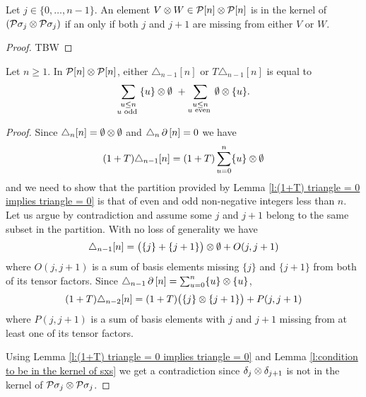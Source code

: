 
\begin{lemma} \label{l:condition to be in the kernel of sxs}
	Let $j \in \{0, \dots, n-1\}$.
	An element $V \otimes W \in \mathcal{P}[n] \otimes \mathcal{P}[n]$ is in the kernel of $(\mathcal{P} \sigma_j \otimes \mathcal{P} \sigma_j)$ if an only if both $j$ and $j+1$ are missing from either $V$ or $W$.
\end{lemma}

\begin{proof}
	TBW
\end{proof}

\begin{lemma}
	Let $n \geq 1$.
	In $\mathcal{P}[n] \otimes \mathcal{P}[n]$, either $\triangle_{n-1} [n]$ or $T \triangle_{n-1} [n]$ is equal to
	\[
	\sum_{\substack{u \leq n \\ u \text{ odd }}} \{u\} \otimes \emptyset \ +
	\sum_{\substack{u \leq n \\ u \text{ even }}} \emptyset \otimes \{u\}.
	\]
\end{lemma}

\begin{proof}
	Since $\triangle_{n} [n] = \emptyset \otimes \emptyset$ and $\triangle_{n} \operatorname{\partial} \, [n] = 0$ we have
	\[
	(1+T) \triangle_{n-1} [n] = (1+T) \sum_{u=0}^n \{u\} \otimes \emptyset
	\]
	and we need to show that the partition provided by Lemma \ref{l:(1+T) triangle = 0 implies triangle = 0} is that of even and odd non-negative integers less than $n$.
	Let us argue by contradiction and assume some $j$ and $j+1$ belong to the same subset in the partition.
	With no loss of generality we have
	\[
	\triangle_{n-1} [n] = \big( \{j\} + \{j+1\} \big) \otimes \emptyset + O(j, j+1)
	\]
	where $O(j, j+1)$ is a sum of basis elements missing $\{j\}$ and $\{j+1\}$ from both of its tensor factors.
	Since $\triangle_{n-1} \operatorname{\partial} \, [n] = \sum_{u=0}^{n} \{u\} \otimes \{u\}$,
	\[
	(1+T) \triangle_{n-2} [n] = (1+T) \big( \{j\} \otimes \{j+1\} \big) + P(j, j+1)
	\]
	where $P(j, j+1)$ is a sum of basis elements with $j$ and $j+1$ missing from at least one of its tensor factors.

	Using Lemma \ref{l:(1+T) triangle = 0 implies triangle = 0} and Lemma \ref{l:condition to be in the kernel of sxs} we get a contradiction since $\delta_j \otimes \delta_{j+1}$ is not in the kernel of $\mathcal{P} \sigma_j \otimes \mathcal{P} \sigma_j$.
\end{proof}